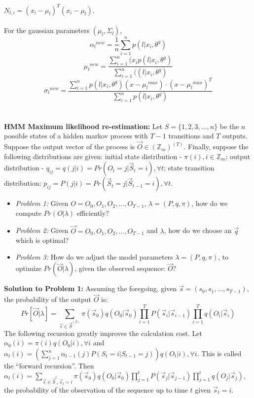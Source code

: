 $N_{l,i} = (x_i-\mu_l)^T (x_i-\mu_l)$.
\\
\\
For the gaussian parameters $(\mu_l, \Sigma_l)$,
$${\alpha_l}^{new} =
{\frac {1} {n}} \sum_{i=1}^n p(l|x_i, \theta^g)
$$
$${\mu_l}^{new} =
{\frac {\sum_{i=1}^n (x_i p(l|x_i, \theta^g)}
{\sum_{i=1}^n ((l|x_i, \theta^g)}}$$
$${\sigma_l}^{new} =
{\frac {\sum_{i=1}^n p(l|x_i, \theta^g)(x-{\mu_l}^{max}) \cdot (x-{\mu_l}^{max})^T}
{\sum_{i=1}^n p(l|x_i, \theta^g)}}$$
\\
\\
{\bf HMM Maximum likelihood re-estimation:}
Let $S= \{ 1,2,3, \ldots, n\}$ be the $n$ possible
states of a hidden markov process with $T-1$ transitions and $T$ outputs.
Suppose the output vector of the process
is ${\vec O} \in ({\mathbb Z}_m)^{(T)}$.  Finally, suppose the following distributions
are given:
initial state distribution - $\pi(i), i \in {\mathbb Z}_m$;
output distribution - $q_{ij}= q(j|i)= Pr(O_t=j | {\vec S_t}= i), \forall t$;
state transition distribution: 
$p_{ij}=P(j|i)= Pr({\vec S}_t=j | {\vec S}_{t-1}= i), \forall t$.
\begin {itemize}
\item \emph{Problem 1:} Given
$O= O_0, O_1, O_2, ..., O_{T-1}$, $\lambda=(P, q, \pi)$, how do we compute $Pr(O| \lambda)$
efficiently?
\item \emph{Problem 2:} Given
${\vec O}= O_0, O_1, O_2, ..., O_{T-1}$ and $\lambda$, how do we choose an
${\vec q}$ which is optimal?
\item \emph{Problem 3:} How do we adjust the model parameters $\lambda=(P, q, \pi)$, 
to optimize $Pr({\vec O} | \lambda)$, given the observed sequence: ${\vec O}$?
\end {itemize}
{\bf Solution to Problem 1:}
Assuming the foregoing, given ${\vec s}= (s_0, s_1, \ldots , s_{T-1})$,
the probability of the output ${\vec O}$ is:
$$
Pr[{\vec O} | \lambda] = \sum_{{\vec s} \in {\vec S}^{(T)}}
\pi({\vec s}_0) q(O_0 | {\vec s}_0)
\prod_{i=1}^T P({\vec s}_{i}|{\vec s}_{i-1})
\prod_{i=1}^T q(O_{i}|{\vec s}_{i})
$$
The following recursion greatly improves the calculation cost.
Let $\alpha_0(i)= \pi(i) q(O_0 | i), \forall i$ and 
$\alpha_t(i)= (\sum_{j=1}^n \alpha_{t-1} (j) P(S_t=i | S_{t-1}=j)) q(O_t|i), \forall i$.
This is called the ``forward recursion''.
Then $\alpha_t(i) =
\sum_{{\vec s} \in {\vec S}^t, {\vec s}_t=i}
\pi({\vec s}_0) q(O_0 | {\vec s}_0)
\prod_{j=1}^t P({\vec s}_{j}|{\vec s}_{j-1}) 
\prod_{j=1}^t q(O_{j}|{\vec s}_{j})$,
the probability of the observation of
the sequence up to time $t$ given ${\vec s}_t=i$.
